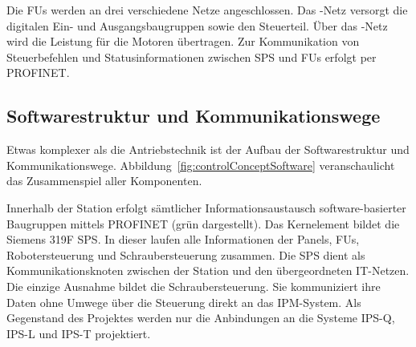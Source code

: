Die FUs werden an drei verschiedene Netze angeschlossen. Das -Netz versorgt die digitalen Ein- und Ausgangsbaugruppen sowie den Steuerteil. Über das -Netz wird die Leistung für die Motoren übertragen. Zur Kommunikation von Steuerbefehlen und Statusinformationen zwischen SPS und FUs erfolgt per PROFINET.

\subsection*{Softwarestruktur und Kommunikationswege}


Etwas komplexer als die Antriebstechnik ist der Aufbau der Softwarestruktur und Kommunikationswege. Abbildung~\ref{fig:controlConceptSoftware} veranschaulicht das Zusammenspiel aller Komponenten.

Innerhalb der Station erfolgt sämtlicher Informationsaustausch software-basierter Baugruppen mittels PROFINET (grün dargestellt). Das Kernelement bildet die Siemens 319F SPS. In dieser laufen alle Informationen der Panels, FUs, Robotersteuerung und Schraubersteuerung zusammen.
Die SPS dient als Kommunikationsknoten zwischen der Station und den übergeordneten IT-Netzen. Die einzige Ausnahme bildet die Schraubersteuerung. Sie kommuniziert ihre Daten ohne Umwege über die Steuerung direkt an das IPM-System.
Als Gegenstand des Projektes werden nur die Anbindungen an die Systeme IPS-Q, IPS-L und IPS-T projektiert.


%
